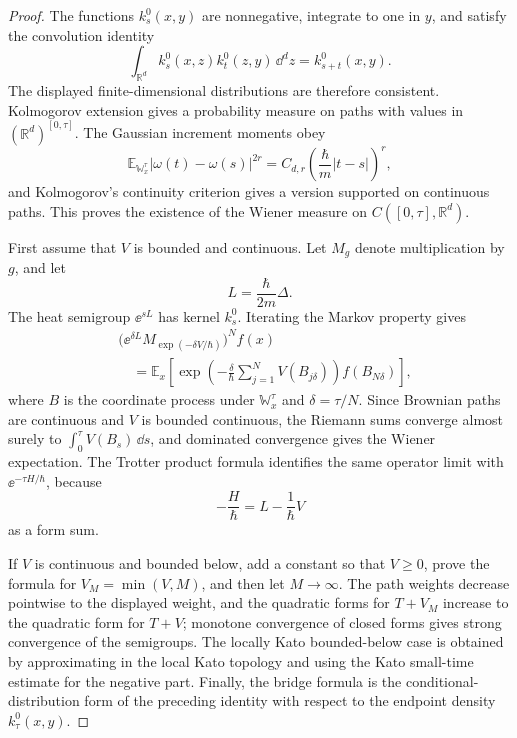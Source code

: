 \begin{proof}
The functions \(k^0_s(x,y)\) are nonnegative, integrate to one in \(y\), and
satisfy the convolution identity
\[
  \int_{\mathbb R^d} k^0_s(x,z)k^0_t(z,y)\,\dd^dz
  =
  k^0_{s+t}(x,y).
\]
The displayed finite-dimensional distributions are therefore consistent.
Kolmogorov extension gives a probability measure on paths with values in
\((\mathbb R^d)^{[0,\tau]}\).  The Gaussian increment moments obey
\[
  \mathbb E_{\mathbb W_x^\tau}
  |\omega(t)-\omega(s)|^{2r}
  =
  C_{d,r}\left(\frac{\hbar}{m}|t-s|\right)^r ,
\]
and Kolmogorov's continuity criterion gives a version supported on continuous
paths.  This proves the existence of the Wiener measure on
\(C([0,\tau],\mathbb R^d)\).

First assume that \(V\) is bounded and continuous.  Let
\(M_g\) denote multiplication by \(g\), and let
\[
  L=\frac{\hbar}{2m}\Delta .
\]
The heat semigroup \(\ee^{sL}\) has kernel \(k^0_s\).  Iterating the Markov
property gives
\[
\begin{aligned}
  &\bigl(\ee^{\delta L}M_{\exp(-\delta V/\hbar)}
  \bigr)^N f(x)\\
  &\quad =
  \mathbb E_x\left[
    \exp\left(
      -\frac{\delta}{\hbar}\sum_{j=1}^N V(B_{j\delta})
    \right)
    f(B_{N\delta})
  \right],
\end{aligned}
\]
where \(B\) is the coordinate process under \(\mathbb W_x^\tau\) and
\(\delta=\tau/N\).  Since Brownian paths are continuous and \(V\) is bounded
continuous, the Riemann sums converge almost surely to
\(\int_0^\tau V(B_s)\,\dd s\), and dominated convergence gives the Wiener
expectation.  The Trotter product formula identifies the same operator limit
with \(\ee^{-\tau H/\hbar}\), because
\[
  -\frac{H}{\hbar}=L-\frac1\hbar V
\]
as a form sum.

If \(V\) is continuous and bounded below, add a constant so that
\(V\ge0\), prove the formula for \(V_M=\min(V,M)\), and then let
\(M\to\infty\).  The path weights decrease pointwise to the displayed weight,
and the quadratic forms for \(T+V_M\) increase to the quadratic form for
\(T+V\); monotone convergence of closed forms gives strong convergence of the
semigroups.  The locally Kato bounded-below case is obtained by approximating
in the local Kato topology and using the Kato small-time estimate for the
negative part.  Finally, the bridge formula is the conditional-distribution
form of the preceding identity with respect to the endpoint density
\(k^0_\tau(x,y)\).
\end{proof}

